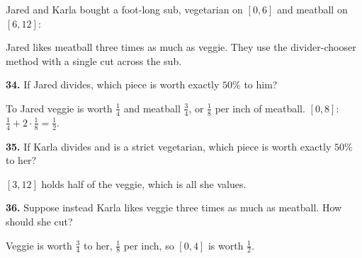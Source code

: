 \documentclass[12pt]{ximera}
\begin{document}
\begin{problem}
Jared and Karla bought a foot-long sub, vegetarian on $[0,6]$ and meatball on $[6,12]$:
\begin{center}
\end{center}
Jared likes meatball three times as much as veggie. They use the divider-chooser method
with a single cut across the sub.

\begin{prompt}
\textbf{34.} If Jared divides, which piece is worth exactly $50\%$ to him?
\begin{multipleChoice}
\choice{$[0,6]$}
\choice{$[4,12]$}
\choice[correct]{$[0,8]$}
\choice{$[6,12]$}
\end{multipleChoice}
\begin{feedback}
To Jared veggie is worth $\frac14$ and meatball $\frac34$, or $\frac18$ per inch of meatball. $[0,8]$: $\frac14+2\cdot\frac18=\frac12$.
\end{feedback}
\end{prompt}

\begin{prompt}
\textbf{35.} If Karla divides and is a strict vegetarian, which piece is worth exactly $50\%$ to her?
\begin{multipleChoice}
\choice{$[0,6]$}
\choice{$[6,12]$}
\choice[correct]{$[3,12]$}
\choice{$[8,12]$}
\end{multipleChoice}
\begin{feedback}
$[3,12]$ holds half of the veggie, which is all she values.
\end{feedback}
\end{prompt}

\begin{prompt}
\textbf{36.} Suppose instead Karla likes veggie three times as much as meatball. How should she cut?
\begin{multipleChoice}
\end{multipleChoice}
\begin{feedback}
Veggie is worth $\frac34$ to her, $\frac18$ per inch, so $[0,4]$ is worth $\frac12$.
\end{feedback}
\end{prompt}


\end{problem}
\end{document}

